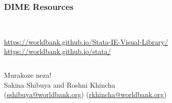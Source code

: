 \documentclass[10pt]{beamer}
\begin{document}
	\begin{frame}
	\frametitle{DIME Resources}
		\begin{center}
		\begin{columns}
		 \\
		\tiny \url{https://worldbank.github.io/Stata-IE-Visual-Library/}
		 \\
		\tiny \url{https://worldbank.github.io/stata/}
		\end{columns}	
		\end{center}
	\end{frame}
	
	\begin{frame}
		\begin{center}
			\Large Murakoze neza! \\
			\vspace{10mm}
			\normalsize Sakina Shibuya and Roshni Khincha  \\
			\small (\url{sshibuya@worldbank.org})
			\small (\url{rkhincha@worldbank.org})			
		\end{center}
	\end{frame}	
	
	
\end{document}
